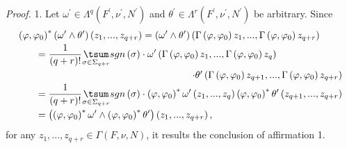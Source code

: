 \documentclass[11pt]{article}
\begin{document}
\emph{Proof.} 1. Let $\omega ^{\prime }\in \Lambda ^{q}\left( F^{\prime
},\nu ^{\prime },N^{\prime }\right) $ and $\theta ^{\prime }\in \Lambda
^{r}\left( F^{\prime },\nu ^{\prime },N^{\prime }\right) $ be arbitrary.
Since
\begin{equation*}
\begin{array}{l}
\displaystyle\left( \varphi ,\varphi _{0}\right) ^{\ast }\left( \omega
^{\prime }\wedge \theta ^{\prime }\right) \left( z_{1},...,z_{q+r}\right)
=\left( \omega ^{\prime }\wedge \theta ^{\prime }\right) \left( \Gamma
\left( \varphi ,\varphi _{0}\right) z_{1},...,\Gamma \left( \varphi ,\varphi
_{0}\right) z_{q+r}\right) \vspace*{1mm} \\
\qquad\displaystyle=\frac{1}{\left( q+r\right) !}\underset{\sigma \in \Sigma
_{q+r}}{\tsum }sgn\left( \sigma \right) \cdot \omega ^{\prime }\left( \Gamma
\left( \varphi ,\varphi _{0}\right) z_{1},...,\Gamma \left( \varphi ,\varphi
_{0}\right) z_{q}\right) \vspace*{1mm} \\
\hfill\cdot \theta ^{\prime }\left( \Gamma \left( \varphi ,\varphi
_{0}\right) z_{q+1},...,\Gamma \left( \varphi ,\varphi _{0}\right)
z_{q+r}\right) \vspace*{1mm} \\
\qquad\displaystyle=\frac{1}{\left( q+r\right) !}\underset{\sigma \in \Sigma
_{q+r}}{\tsum }sgn\left( \sigma \right) \cdot \left( \varphi ,\varphi
_{0}\right) ^{\ast }\omega ^{\prime }\left( z_{1},...,z_{q}\right) \left(
\varphi ,\varphi _{0}\right) ^{\ast }\theta ^{\prime }\left(
z_{q+1},...,z_{q+r}\right) \vspace*{1mm} \\
\qquad\displaystyle=\left( \left( \varphi ,\varphi _{0}\right) ^{\ast
}\omega ^{\prime }\wedge \left( \varphi ,\varphi _{0}\right) ^{\ast }\theta
^{\prime }\right) \left( z_{1},...,z_{q+r}\right) ,%
\end{array}%
\end{equation*}%
for any $z_{1},...,z_{q+r}\in \Gamma \left( F,\nu ,N\right) $, it results
the conclusion of affirmation 1.\medskip
\end{document}
